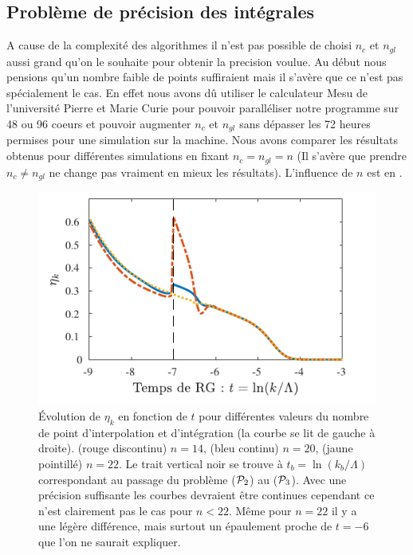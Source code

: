 \documentclass[10.5pt]{article}
\begin{document}
\begin{multicols}{2}
\subsection{Problème de précision des intégrales}


A cause de la complexité des algorithmes il n'est pas possible de choisi $n_c$ et $n_{gl}$ aussi grand qu'on le souhaite pour obtenir la precision voulue. Au début nous pensions qu'un nombre faible de points suffiraient mais il s'avère que ce n'est pas spécialement le cas. En effet nous avons dû utiliser le calculateur Mesu \cite{ wiki:xxx} de l'université Pierre et Marie Curie pour pouvoir paralléliser notre programme sur 48 ou 96 coeurs et pouvoir augmenter $n_c$ et $n_{gl}$ sans dépasser les 72 heures permises pour une simulation sur la machine. Nous avons comparer les résultats obtenus pour différentes simulations en fixant $n_c = n_{gl} = n$ (Il s'avère que prendre $n_c \neq n_{gl}$ ne change pas vraiment en mieux les résultats). L'influence de $n$ est en .

\begin{figure}[H]
\begin{center}
	\includegraphics[width=0.95\columnwidth]{EtakErrMesu.pdf}
\end{center}
\caption{Évolution de $\eta_k$ en fonction de $t$ pour différentes valeurs du nombre de point d'interpolation et d'intégration (la courbe se lit de gauche à droite). (rouge discontinu) $n=14$, (bleu continu) $n=20$, (jaune pointillé) $n=22$. Le trait vertical noir se trouve à $t_b = \ln(k_b/\Lambda)$ correspondant au passage du problème ($\mathcal{P}_2$) au ($\mathcal{P}_3$). Avec une précision suffisante les courbes devraient être continues cependant ce n'est clairement pas le cas pour $n<22$. Même pour $n=22$ il y a une légère différence, mais surtout un épaulement proche de $t=-6$ que l'on ne saurait expliquer.}
\label{fig:etaErr}
\end{figure}


\end{multicols}
\end{document}
